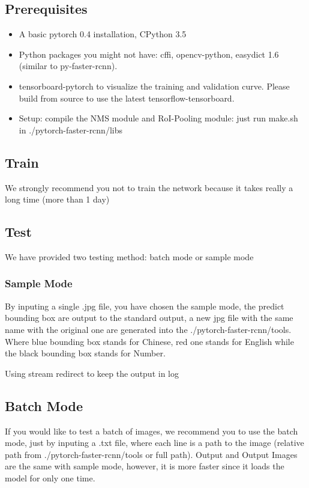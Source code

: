 \documentclass{IEEEtran}
\begin{document}
\subsection{Prerequisites}
\begin{itemize}
\item{A basic pytorch 0.4 installation, CPython 3.5}

\item{Python packages you might not have: cffi, opencv-python, easydict 1.6 (similar to py-faster-rcnn).}

\item{tensorboard-pytorch to visualize the training and validation curve. Please build from source to use the latest tensorflow-tensorboard.}

\item{Setup: compile the NMS module and RoI-Pooling module: just run make.sh in ./pytorch-faster-rcnn/libs}
\end{itemize}

\subsection{Train}
We strongly recommend you not to train the network because it takes really a long time (more than 1 day)



\subsection{Test}

We have provided two testing method: batch mode or sample mode


\subsubsection{Sample Mode}
By inputing a single .jpg file, you have chosen the sample mode, the predict bounding box are output to the 
standard output, a new jpg file with the same name with the original one are generated into the ./pytorch-faster-rcnn/tools. Where blue bounding box stands for Chinese, red one stands for English while the black bounding box stands for Number.

Using stream redirect to keep the output in log

\subsection{Batch Mode}
If you would like to test a batch of images, we recommend you to use the batch mode, just by inputing a .txt file, where each line is a path to the image (relative path from ./pytorch-faster-rcnn/tools or full path). Output and Output Images are the same with sample mode, however, it is more faster since it loads the model for only one time.


\end{document}
